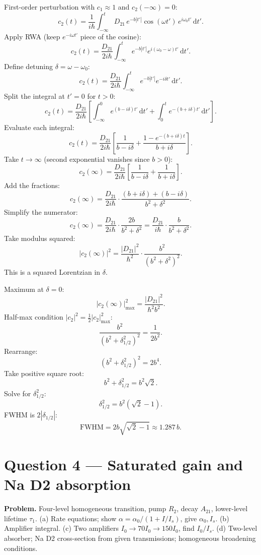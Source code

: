 \documentclass[11pt]{article}
\newcommand{\de}{\mathrm{d}}
\begin{document}
First-order perturbation with $c_1\approx 1$ and $c_2(-\infty)=0$:
\[ c_2(t)=\frac{1}{i\hbar}\int_{-\infty}^t D_{21}\,e^{-b|t'|}\cos(\omega t')\,e^{i\omega_0 t'}\,\de t'. \]
Apply RWA (keep $e^{-i\omega t'}$ piece of the cosine):
\[ c_2(t)=\frac{D_{21}}{2i\hbar}\int_{-\infty}^t e^{-b|t'|}e^{i(\omega_0-\omega) t'}\,\de t'. \]
Define detuning $\delta=\omega-\omega_0$:
\[ c_2(t)=\frac{D_{21}}{2i\hbar}\int_{-\infty}^t e^{-b|t'|}e^{-i\delta t'}\,\de t'. \]
Split the integral at $t'=0$ for $t>0$:
\[ c_2(t)=\frac{D_{21}}{2i\hbar}\left[\int_{-\infty}^0 e^{(b-i\delta)t'}\,\de t'+\int_0^t e^{-(b+i\delta)t'}\,\de t'\right]. \]
Evaluate each integral:
\begin{equation}
c_2(t)=\frac{D_{21}}{2i\hbar}\left[\frac{1}{b-i\delta}+\frac{1-e^{-(b+i\delta)t}}{b+i\delta}\right].
\label{eq:c2-finite}
\end{equation}
Take $t\to\infty$ (second exponential vanishes since $b>0$):
\[ c_2(\infty)=\frac{D_{21}}{2i\hbar}\left[\frac{1}{b-i\delta}+\frac{1}{b+i\delta}\right]. \]
Add the fractions:
\[ c_2(\infty)=\frac{D_{21}}{2i\hbar}\cdot\frac{(b+i\delta)+(b-i\delta)}{b^2+\delta^2}. \]
Simplify the numerator:
\[ c_2(\infty)=\frac{D_{21}}{2i\hbar}\cdot\frac{2b}{b^2+\delta^2}=\frac{D_{21}}{i\hbar}\cdot\frac{b}{b^2+\delta^2}. \]
Take modulus squared:
\[ \boxed{\;|c_2(\infty)|^2=\frac{|D_{21}|^2}{\hbar^2}\cdot\frac{b^2}{(b^2+\delta^2)^2}.\;} \]
This is a squared Lorentzian in $\delta$.

Maximum at $\delta=0$:
\[ |c_2(\infty)|^2_{\max}=\frac{|D_{21}|^2}{\hbar^2 b^2}. \]
Half-max condition $|c_2|^2=\tfrac{1}{2}|c_2|^2_{\max}$:
\[ \frac{b^2}{(b^2+\delta_{1/2}^2)^2}=\frac{1}{2 b^2}. \]
Rearrange:
\[ (b^2+\delta_{1/2}^2)^2=2 b^4. \]
Take positive square root:
\[ b^2+\delta_{1/2}^2=b^2\sqrt 2. \]
Solve for $\delta_{1/2}^2$:
\[ \delta_{1/2}^2=b^2(\sqrt 2-1). \]
FWHM is $2|\delta_{1/2}|$:
\[ \boxed{\;\text{FWHM}=2b\sqrt{\sqrt 2-1}\approx 1.287\,b.\;} \]

\section*{Question 4 --- Saturated gain and Na D2 absorption}

\textbf{Problem.} Four-level homogeneous transition, pump $R_2$, decay $A_{21}$, lower-level lifetime $\tau_1$. (a) Rate equations; show $\alpha=\alpha_0/(1+I/I_s)$, give $\alpha_0,I_s$. (b) Amplifier integral. (c) Two amplifiers $I_0\to 70I_0\to 150I_0$, find $I_0/I_s$. (d) Two-level absorber; Na D2 cross-section from given transmissions; homogeneous broadening conditions.
\end{document}
